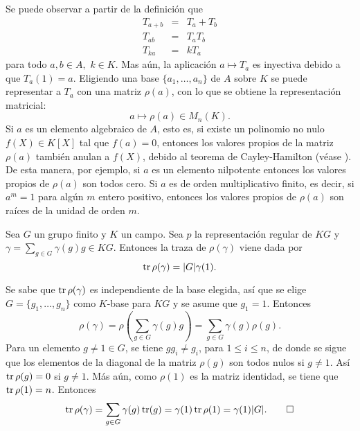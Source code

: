 Se puede observar a partir de la definición que
\begin{eqnarray*}
T_{a+b} &=& T_a + T_b \\
T_{ab} &=& T_aT_b \\
T_{ka} &=& kT_a
\end{eqnarray*}
para todo $a,b \in A,$  $k\in K$. Mas aún, la aplicación $a \mapsto T_a$ es inyectiva debido a que $T_a(1) = a$. Eligiendo una base $\{ a_1, \dots, a_n \}$ de $A$ sobre $K$ se puede representar a $T_a$ con una matriz $\rho(a)$, con lo que  se obtiene la representación matricial:
\begin{equation*}
a \mapsto \rho(a) \in M_n(K).
\end{equation*}
Si $a$ es un elemento algebraico de $A$, esto es, si existe un polinomio no nulo $f(X) \in K[X]$ tal que $f(a) = 0$, entonces los valores propios de la matriz $\rho(a)$ también anulan a $f(X)$, debido al teorema de Cayley-Hamilton (véase \cite[p. 241]{bib:lang}). De esta manera, por ejemplo, si $a$ es un elemento nilpotente entonces los valores propios de $\rho(a)$ son todos cero. Si $a$ es de orden multiplicativo finito, es decir, si $a^m = 1$ para algún $m$ entero positivo, entonces los valores propios de $\rho(a)$ son raíces de la unidad de orden $m$. 
\begin{lema}\label{lem:traza}
Sea $G$ un grupo finito y $K$ un campo. Sea $p$ la representación regular de $KG$ y $\gamma = \sum_{g \in G}\gamma(g)g \in KG$. Entonces la traza de $\rho(\gamma)$ viene dada por
\begin{equation*}
\operatorname{tr}\rho(\gamma) = |G|\gamma(1).
\end{equation*}
\end{lema} 
\begin{proof*}
Se sabe que $\operatorname{tr}\rho(\gamma)$ es independiente de la base elegida, así que se elige $G=\{g_1, \dots, g_n \}$ como $K$-base para $KG$ y se asume que $g_1=1$.
Entonces
\begin{equation*}
\rho(\gamma) = \rho\left( \sum_{g \in G}\gamma(g)g \right) = \sum_{g \in G}\gamma(g)\rho(g) .
\end{equation*}
Para un elemento $g\neq 1 \in G$, se tiene $gg_i \neq g_i$, para $1\leq i\leq n$, de donde se sigue que los elementos de la diagonal de la matriz $\rho(g)$ son todos nulos si $g \neq 1$. Así $\operatorname{tr}\rho(g) = 0$ si $g \neq 1$. Más aún, como $\rho(1)$ es la matriz identidad, se tiene que $\operatorname{tr}\rho(1) = n$. Entonces
\begin{equation*}
\operatorname{tr}\rho(\gamma) = \sum_{g \in G}\gamma(g)\operatorname{tr}(g) = \gamma(1)\operatorname{tr}\rho(1) = \gamma(1)|G|.\qedhere
\end{equation*} 
\end{proof*}

